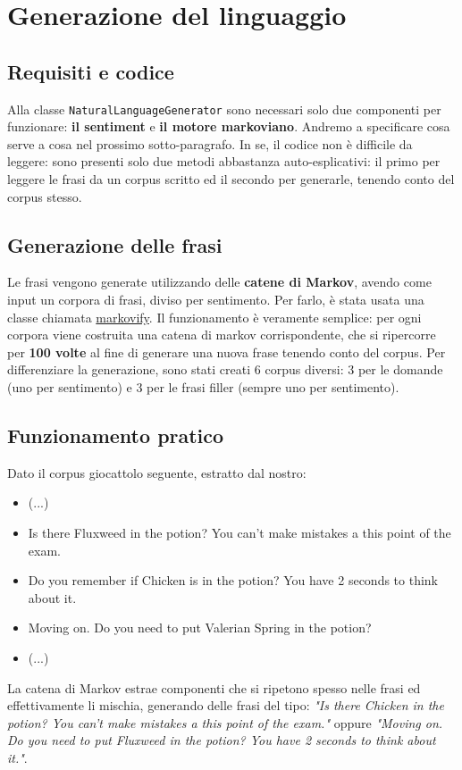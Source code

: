 \section{Generazione del linguaggio}
\subsection{Requisiti e codice}
Alla classe \texttt{NaturalLanguageGenerator} sono necessari solo due componenti per funzionare: \textbf{il sentiment} e \textbf{il motore markoviano}. Andremo a specificare cosa serve a cosa nel prossimo sotto-paragrafo.
In se, il codice non è difficile da leggere: sono presenti solo due metodi abbastanza auto-esplicativi: il primo per leggere le frasi da un corpus scritto ed il secondo per generarle, tenendo conto del corpus stesso.

\subsection{Generazione delle frasi}
Le frasi vengono generate utilizzando delle \textbf{catene di Markov}, avendo come input un corpora di frasi, diviso per sentimento. Per farlo, è stata usata una classe chiamata \href{https://github.com/jsvine/markovify}{markovify}. Il funzionamento è veramente semplice: per ogni corpora viene costruita una catena di markov corrispondente, che si ripercorre per \textbf{100 volte} al fine di generare una nuova frase tenendo conto del corpus. Per differenziare la generazione, sono stati creati 6 corpus diversi: 3 per le domande (uno per sentimento) e 3 per le frasi filler (sempre uno per sentimento).

\subsection{Funzionamento pratico}
Dato il corpus giocattolo seguente, estratto dal nostro:
\begin{itemize}
    \item (...)
    \item Is there Fluxweed in the potion? You can't make mistakes a this point of the exam.
    \item Do you remember if Chicken is in the potion? You have 2 seconds to think about it.
    \item Moving on. Do you need to put Valerian Spring in the potion?
    \item (...)
\end{itemize}
La catena di Markov estrae componenti che si ripetono spesso nelle frasi ed effettivamente li mischia, generando delle frasi del tipo: \textit{"Is there Chicken in the potion? You can't make mistakes a this point of the exam."} oppure \textit{"Moving on. Do you need to put Fluxweed in the potion? You have 2 seconds to think about it."}.

